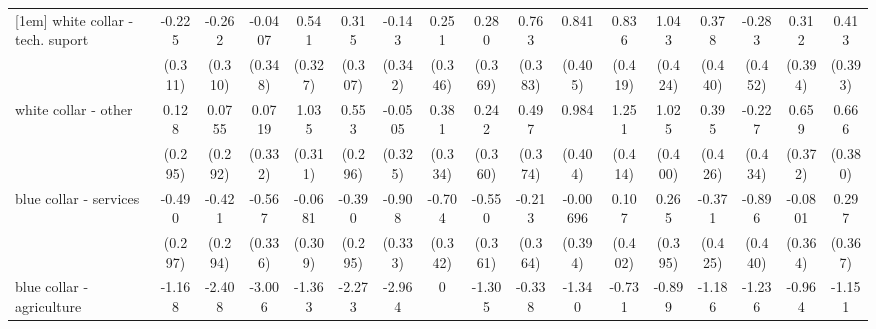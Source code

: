 {\begin{tabular}{l*{16}{c}}
[1em]
white collar - tech. suport&      -0.225         &      -0.262         &     -0.0407         &       0.541         &       0.315         &      -0.143         &       0.251         &       0.280         &       0.763\sym{*}  &       0.841\sym{*}  &       0.836\sym{*}  &       1.043\sym{*}  &       0.378         &      -0.283         &       0.312         &       0.413         \\
                    &     (0.311)         &     (0.310)         &     (0.348)         &     (0.327)         &     (0.307)         &     (0.342)         &     (0.346)         &     (0.369)         &     (0.383)         &     (0.405)         &     (0.419)         &     (0.424)         &     (0.440)         &     (0.452)         &     (0.394)         &     (0.393)         \\
[1em]
white collar - other&       0.128         &      0.0755         &      0.0719         &       1.035\sym{***}&       0.553         &     -0.0505         &       0.381         &       0.242         &       0.497         &       0.984\sym{*}  &       1.251\sym{**} &       1.025\sym{*}  &       0.395         &      -0.227         &       0.659         &       0.666         \\
                    &     (0.295)         &     (0.292)         &     (0.332)         &     (0.311)         &     (0.296)         &     (0.325)         &     (0.334)         &     (0.360)         &     (0.374)         &     (0.404)         &     (0.414)         &     (0.400)         &     (0.426)         &     (0.434)         &     (0.372)         &     (0.380)         \\
[1em]
blue collar - services&      -0.490         &      -0.421         &      -0.567         &     -0.0681         &      -0.390         &      -0.908\sym{**} &      -0.704\sym{*}  &      -0.550         &      -0.213         &    -0.00696         &       0.107         &       0.265         &      -0.371         &      -0.896\sym{*}  &     -0.0801         &       0.297         \\
                    &     (0.297)         &     (0.294)         &     (0.336)         &     (0.309)         &     (0.295)         &     (0.333)         &     (0.342)         &     (0.361)         &     (0.364)         &     (0.394)         &     (0.402)         &     (0.395)         &     (0.425)         &     (0.440)         &     (0.364)         &     (0.367)         \\
[1em]
blue collar - agriculture&      -1.168         &      -2.408\sym{**} &      -3.006\sym{**} &      -1.363         &      -2.273\sym{*}  &      -2.964\sym{**} &           0         &      -1.305         &      -0.338         &      -1.340         &      -0.731         &      -0.899         &      -1.186         &      -1.236         &      -0.964         &      -1.151         \\

\end{tabular}}
